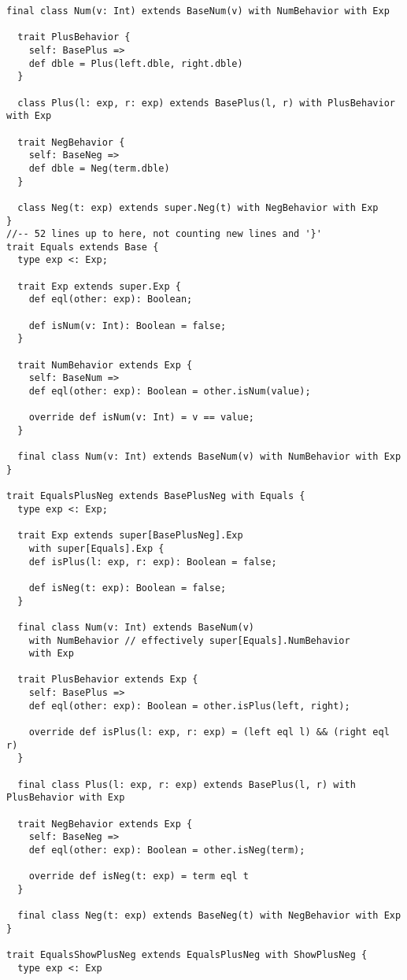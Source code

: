 \begin{lstlisting}[basicstyle=\tiny]
  final class Num(v: Int) extends BaseNum(v) with NumBehavior with Exp

  trait PlusBehavior {
    self: BasePlus =>
    def dble = Plus(left.dble, right.dble)
  }

  class Plus(l: exp, r: exp) extends BasePlus(l, r) with PlusBehavior with Exp

  trait NegBehavior {
    self: BaseNeg =>
    def dble = Neg(term.dble)
  }

  class Neg(t: exp) extends super.Neg(t) with NegBehavior with Exp
}
//-- 52 lines up to here, not counting new lines and '}'
trait Equals extends Base {
  type exp <: Exp;

  trait Exp extends super.Exp {
    def eql(other: exp): Boolean;

    def isNum(v: Int): Boolean = false;
  }

  trait NumBehavior extends Exp {
    self: BaseNum =>
    def eql(other: exp): Boolean = other.isNum(value);

    override def isNum(v: Int) = v == value;
  }

  final class Num(v: Int) extends BaseNum(v) with NumBehavior with Exp
}

trait EqualsPlusNeg extends BasePlusNeg with Equals {
  type exp <: Exp;

  trait Exp extends super[BasePlusNeg].Exp
    with super[Equals].Exp {
    def isPlus(l: exp, r: exp): Boolean = false;

    def isNeg(t: exp): Boolean = false;
  }

  final class Num(v: Int) extends BaseNum(v)
    with NumBehavior // effectively super[Equals].NumBehavior
    with Exp

  trait PlusBehavior extends Exp {
    self: BasePlus =>
    def eql(other: exp): Boolean = other.isPlus(left, right);

    override def isPlus(l: exp, r: exp) = (left eql l) && (right eql r)
  }

  final class Plus(l: exp, r: exp) extends BasePlus(l, r) with PlusBehavior with Exp

  trait NegBehavior extends Exp {
    self: BaseNeg =>
    def eql(other: exp): Boolean = other.isNeg(term);

    override def isNeg(t: exp) = term eql t
  }

  final class Neg(t: exp) extends BaseNeg(t) with NegBehavior with Exp
}

trait EqualsShowPlusNeg extends EqualsPlusNeg with ShowPlusNeg {
  type exp <: Exp


\end{lstlisting}
